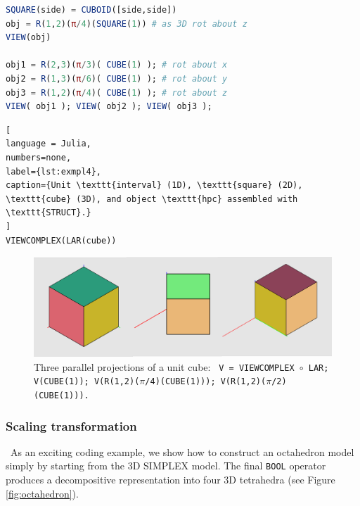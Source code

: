 \documentclass{juliacon}
\begin{document}
\begin{lstlisting}[language = Julia,numbers=none,label={lst:exmpl3},
caption={2D and 3D rotations.}
]
SQUARE(side) = CUBOID([side,side])		
obj = R(1,2)(π/4)(SQUARE(1)) # as 3D rot about z
VIEW(obj)

obj1 = R(2,3)(π/3)( CUBE(1) ); # rot about x 
obj2 = R(1,3)(π/6)( CUBE(1) ); # rot about y
obj3 = R(1,2)(π/4)( CUBE(1) ); # rot about z
VIEW( obj1 ); VIEW( obj2 ); VIEW( obj3 ); 
\end{lstlisting}
\begin{lstlisting}[
language = Julia,
numbers=none,
label={lst:exmpl4},
caption={Unit \texttt{interval} (1D), \texttt{square} (2D), \texttt{cube} (3D), and object \texttt{hpc} assembled with \texttt{STRUCT}.}
]
VIEWCOMPLEX(LAR(cube))
\end{lstlisting}
\begin{figure}[htbp] %
   \includegraphics[width=\linewidth]{figs/3-cubes} 
   \caption{\scriptsize{Three parallel projections of a unit cube: {\tt
   V = VIEWCOMPLEX $\circ$ LAR; \\
   V(CUBE(1)); 
   V(R(1,2)($\pi$/4)(CUBE(1))); V(R(1,2)($\pi$/2)(CUBE(1))).}}}
   \label{fig:4:3-cubes}
\end{figure}


\subsubsection*{Scaling transformation}\ 
As an exciting coding example, we show how to construct an octahedron model simply by starting from the 3D SIMPLEX model. The final {\tt BOOL} operator produces a decompositive representation into four 3D tetrahedra (see Figure \ref{fig:octahedron}).
\end{document}
